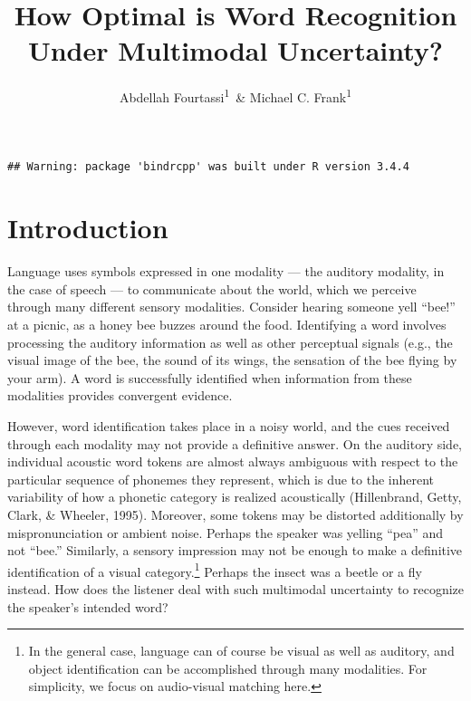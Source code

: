 \documentclass[english,,man,floatsintext]{apa6}
\title{How Optimal is Word Recognition Under Multimodal Uncertainty?}
\author{Abdellah Fourtassi\textsuperscript{1}~\& Michael C.
Frank\textsuperscript{1}}
\date{}
\affiliation{
\vspace{0.5cm}
\textsuperscript{1} Department of Psychology, Stanford University}
\let\rmarkdownfootnote\footnote%
\def\footnote{\protect\rmarkdownfootnote}
\theoremstyle{definition}
\theoremstyle{definition}
\theoremstyle{definition}
\theoremstyle{remark}
\begin{document}
\maketitle

\begin{verbatim}
## Warning: package 'bindrcpp' was built under R version 3.4.4
\end{verbatim}

\section{Introduction}\label{introduction}

Language uses symbols expressed in one modality --- the auditory
modality, in the case of speech --- to communicate about the world,
which we perceive through many different sensory modalities. Consider
hearing someone yell \enquote{bee!} at a picnic, as a honey bee buzzes
around the food. Identifying a word involves processing the auditory
information as well as other perceptual signals (e.g., the visual image
of the bee, the sound of its wings, the sensation of the bee flying by
your arm). A word is successfully identified when information from these
modalities provides convergent evidence.

However, word identification takes place in a noisy world, and the cues
received through each modality may not provide a definitive answer. On
the auditory side, individual acoustic word tokens are almost always
ambiguous with respect to the particular sequence of phonemes they
represent, which is due to the inherent variability of how a phonetic
category is realized acoustically (Hillenbrand, Getty, Clark, \&
Wheeler, 1995). Moreover, some tokens may be distorted additionally by
mispronunciation or ambient noise. Perhaps the speaker was yelling
\enquote{pea} and not \enquote{bee.} Similarly, a sensory impression may
not be enough to make a definitive identification of a visual
category.\footnote{In the general case, language can of course be visual as well as auditory, and object identification can be accomplished through many modalities. For simplicity, we focus on audio-visual matching here.}
Perhaps the insect was a beetle or a fly instead. How does the listener
deal with such multimodal uncertainty to recognize the speaker's
intended word?
\end{document}
